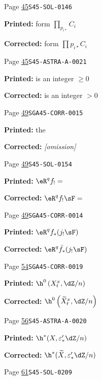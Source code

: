 \begin{description}
\smallskip
\item[\hypertarget{apparatus:EN-0014}{14}] Page \hyperlink{printpage:en:45}{45}\quad\texttt{S45-SOL-0146}
\par\noindent\textbf{Printed:} form $\prod_{p_{i*}}C_i$
\par\noindent\textbf{Corrected:} form $\prod p_{i*}C_i$
\smallskip
\item[\hypertarget{apparatus:EN-0015}{15}] Page \hyperlink{printpage:en:45}{45}\quad\texttt{S45-ASTRA-A-0021}
\par\noindent\textbf{Printed:} is an integer $\geqslant0$
\par\noindent\textbf{Corrected:} is an integer $>0$
\smallskip
\item[\hypertarget{apparatus:EN-0016}{16}] Page \hyperlink{printpage:en:49}{49}\quad\texttt{SGA45-CORR-0015}
\par\noindent\textbf{Printed:} the 
\par\noindent\textbf{Corrected:} \emph{\textnormal{[omission]}}
\smallskip
\item[\hypertarget{apparatus:EN-0017}{17}] Page \hyperlink{printpage:en:49}{49}\quad\texttt{S45-SOL-0154}
\par\noindent\textbf{Printed:} \(\eR^q f_! =\)
\par\noindent\textbf{Corrected:} \(\eR^q f_! \sF =\)
\smallskip
\item[\hypertarget{apparatus:EN-0018}{18}] Page \hyperlink{printpage:en:49}{49}\quad\texttt{SGA45-CORR-0014}
\par\noindent\textbf{Printed:} \(\eR^q f_*(j_! \sF)\)
\par\noindent\textbf{Corrected:} \(\eR^q \bar f_*(j_! \sF)\)
\smallskip
\item[\hypertarget{apparatus:EN-0019}{19}] Page \hyperlink{printpage:en:54}{54}\quad\texttt{SGA45-CORR-0019}
\par\noindent\textbf{Printed:} \(\h^0\left(X_t^x,\dZ/n\right)\)
\par\noindent\textbf{Corrected:} \(\h^0\left(\widetilde X_t^x,\dZ/n\right)\)
\smallskip
\item[\hypertarget{apparatus:EN-0020}{20}] Page \hyperlink{printpage:en:56}{56}\quad\texttt{S45-ASTRA-A-0020}
\par\noindent\textbf{Printed:} \(\h^*(X,\varepsilon_*' \dZ/n)\)
\par\noindent\textbf{Corrected:} \(\h^*(\widetilde X,\varepsilon_*' \dZ/n)\)
\smallskip
\item[\hypertarget{apparatus:EN-0021}{21}] Page \hyperlink{printpage:en:61}{61}\quad\texttt{S45-SOL-0209}

\end{description}
